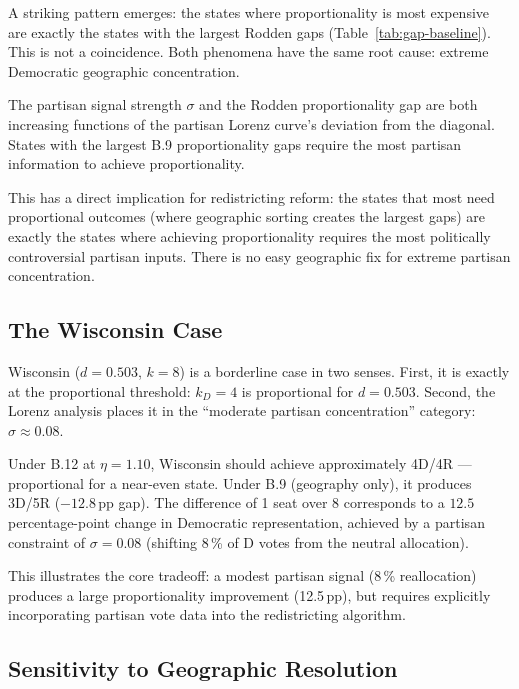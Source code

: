 A striking pattern emerges: the states where proportionality is most expensive
are exactly the states with the largest Rodden gaps (Table~\ref{tab:gap-baseline}).
This is not a coincidence. Both phenomena have the same root cause: extreme
Democratic geographic concentration.

\begin{proposition}
\label{prop:rodden-sigma}
The partisan signal strength $\sigma$ and the Rodden proportionality gap are
both increasing functions of the partisan Lorenz curve's deviation from the
diagonal. States with the largest B.9 proportionality gaps require the most
partisan information to achieve proportionality.
\end{proposition}

This has a direct implication for redistricting reform: the states that most
need proportional outcomes (where geographic sorting creates the largest gaps)
are exactly the states where achieving proportionality requires the most
politically controversial partisan inputs. There is no easy geographic fix
for extreme partisan concentration.

\subsection{The Wisconsin Case}

Wisconsin ($d = 0.503$, $k=8$) is a borderline case in two senses.
First, it is exactly at the proportional threshold: $k_D = 4$ is proportional
for $d = 0.503$.
Second, the Lorenz analysis places it in the ``moderate partisan concentration''
category: $\sigma \approx 0.08$.

Under B.12 at $\eta = 1.10$, Wisconsin should achieve approximately 4D/4R ---
proportional for a near-even state.
Under B.9 (geography only), it produces 3D/5R ($-12.8$\,pp gap).
The difference of 1 seat over 8 corresponds to a $12.5$ percentage-point
change in Democratic representation, achieved by a partisan constraint
of $\sigma = 0.08$ (shifting 8\,\% of D votes from the neutral allocation).

This illustrates the core tradeoff: a modest partisan signal (8\,\% reallocation)
produces a large proportionality improvement (12.5\,pp), but requires
explicitly incorporating partisan vote data into the redistricting algorithm.

\subsection{Sensitivity to Geographic Resolution}
\label{sec:compromise:maup}

